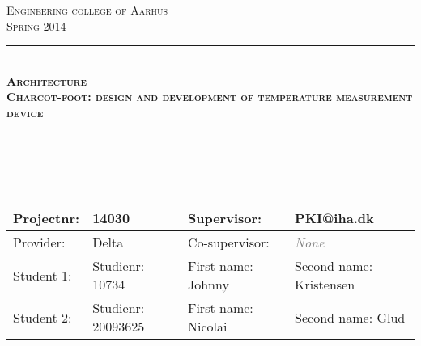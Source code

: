 \newcommand{\HRule}{\rule{\linewidth}{0.5mm}} %

\begin{center} %
 

\textsc{\LARGE Engineering college of Aarhus}\\[1.5cm] %
\textsc{\large Spring 2014}\\[0.5cm] %


\HRule \\[0.4cm]
{ \Large \bfseries \textsc{Architecture}}\\ %
{ \huge \bfseries \textsc{Charcot-foot: design and development of temperature measurement device}}\\[0.4cm] %
\HRule \\[1.5cm]
\ \\
\ \\
\vfill
\begin{table}[H]
\centering
    \begin{tabular}{|l|l|l|p{4cm}|}
    \hline
    Projectnr:   & 14030                                                       & Supervisor:             & PKI@iha.dk              \\ \hline
    Provider:    & Delta                                                       & Co-supervisor:          & \textcolor{gray}{\textit{None}}           \\ \hline
    Student  1:  & Studienr: 10734                                             & First name: Johnny      & Second name: Kristensen \\ \hline
    Student  2:  & Studienr: 20093625                                          & First name: Nicolai     & Second name: Glud       \\ \hline
    \end{tabular}


\end{table}
\end{center}

